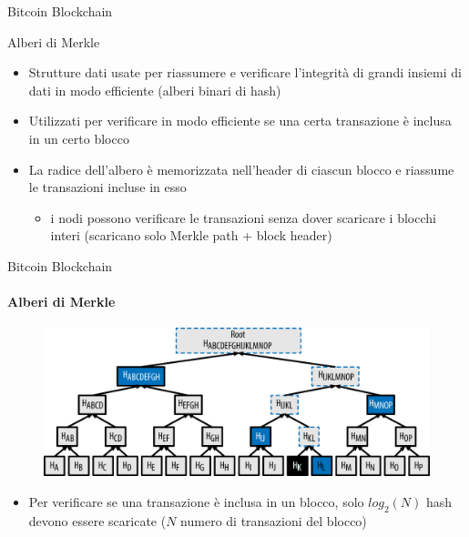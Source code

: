 \documentclass{beamer}
\begin{document}
  
  
  \begin{frame}{Bitcoin Blockchain}
      \begin{block}{Alberi di Merkle}
          \begin{itemize}
              \item Strutture dati usate per riassumere e verificare l'integrità di grandi insiemi di dati in modo efficiente (alberi binari di hash)
              \item Utilizzati per verificare in modo efficiente se una certa transazione è inclusa in un certo blocco
              \item La radice dell'albero è memorizzata nell'header di ciascun blocco e riassume le transazioni incluse in esso
              \begin{itemize}
                  \item [\MVRightarrow] i nodi possono verificare le transazioni senza dover scaricare i blocchi interi (scaricano solo Merkle path + block header)
              \end{itemize} 
          \end{itemize}
      \end{block}
  \end{frame}
  
  
  
  \begin{frame}{Bitcoin Blockchain}
    \framesubtitle{Alberi di Merkle}
    \begin{figure}
      \includegraphics[width=0.6\linewidth]{../img/merkle-tree-path.png}
    \end{figure}
    \begin{itemize}
        \item Per verificare se una transazione è inclusa in un blocco, solo  $log_2(N)$ hash devono essere scaricate ($N$ numero di transazioni del blocco)
    \end{itemize}
  \end{frame}
  
  
  
  
  
\end{document}
